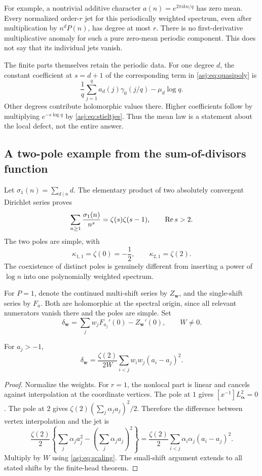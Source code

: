 For example, a nontrivial additive character $a(n)=e^{2\pi i kn/q}$ has
zero mean. Every normalized order-$r$ jet for this periodically weighted
spectrum, even after multiplication by $n^dP(n)$, has degree at most $r$.
There is no first-derivative multiplicative anomaly for such a pure
zero-mean periodic component. This does not say that its individual jets
vanish.

The finite parts themselves retain the periodic data. For one degree $d$,
the constant coefficient at $s=d+1$ of the corresponding term in
\eqref{asj:eq:quasipoly} is
\[
 \frac1q\sum_{j=1}^q a_d(j)\gamma_0(j/q)-\mu_d\log q.
\]
Other degrees contribute holomorphic values there. Higher coefficients
follow by multiplying $e^{-s\log q}$ by \eqref{asj:eq:stieltjes}. Thus the
mean law is a statement about the local defect, not the entire answer.

\subsection{A two-pole example from the sum-of-divisors function}
Let $\sigma_1(n)=\sum_{d\mid n}d$. The elementary product of two
absolutely convergent Dirichlet series proves
\begin{equation}\label{asj:eq:sigma1}
 \sum_{n\ge1}\frac{\sigma_1(n)}{n^s}=\zeta(s)\zeta(s-1),
 \qquad \operatorname{Re} s>2.
\end{equation}
The two poles are simple, with
\[
 \kappa_{1,1}=\zeta(0)=-\frac12,
 \qquad \kappa_{2,1}=\zeta(2).
\]
The coexistence of distinct poles is genuinely different from inserting
a power of $\log n$ into one polynomially weighted spectrum.

For $P=1$, denote the continued multi-shift series by $Z_{\boldsymbol w}$,
and the single-shift series by $F_a$. Both are holomorphic at the spectral
origin, since all relevant numerators vanish there and the poles are simple.
Set
\[
 \delta_{\boldsymbol w}=
        \sum_j w_jF_{a_j}'(0)-Z_{\boldsymbol w}'(0),\qquad W\ne0.
\]
\begin{proposition}\label{asj:thm:sigma}
For $a_j>-1$,
\begin{equation}\label{asj:eq:sigma-anomaly}
 \boxed{\displaystyle
 \delta_{\boldsymbol w}
      =\frac{\zeta(2)}{2W}
                 \sum_{i<j}w_iw_j(a_i-a_j)^2.}
\end{equation}
\end{proposition}
\begin{proof}
Normalize the weights. For $r=1$, the nonlocal part is linear and cancels
against interpolation at the coordinate vertices. The pole at $1$ gives
$[x^{-1}]L_{\boldsymbol\alpha}^2=0$. The pole at $2$ gives
$\zeta(2)(\sum_j\alpha_ja_j)^2/2$. Therefore the difference between
vertex interpolation and the jet is
\[
 \frac{\zeta(2)}2\left\{
       \sum_j\alpha_ja_j^2-\left(\sum_j\alpha_ja_j\right)^2\right\}
   =\frac{\zeta(2)}2\sum_{i<j}\alpha_i\alpha_j(a_i-a_j)^2.
\]
Multiply by $W$ using \eqref{asj:eq:scaling}. The small-shift argument extends
to all stated shifts by the finite-head theorem.
\end{proof}

